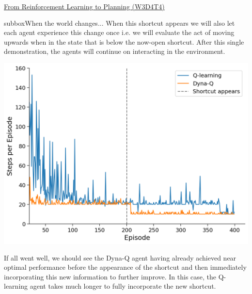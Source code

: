 \begin{textbox}{\href{https://compneuro.neuromatch.io/tutorials/W3D4_ReinforcementLearning/student/W3D4_Tutorial4.html}{From Reinforcement Learning to Planning (W3D4T4)} }
\begin{subbox}{subbox}{When the world changes...}
When this shortcut appears we will also let each agent experience this change once i.e. we will evaluate the act of moving upwards when in the state that is below the now-open shortcut. After this single demonstration, the agents will continue on interacting in the environment.
\begin{center}
    
\includegraphics[scale=0.14]{Figures/RL/RL_Figure20.png}
\end{center}

If all went well, we should see the Dyna-Q agent having already achieved near optimal performance before the appearance of the shortcut and then immediately incorporating this new information to further improve. In this case, the Q-learning agent takes much longer to fully incorporate the new shortcut.


\end{subbox}
\end{textbox}
